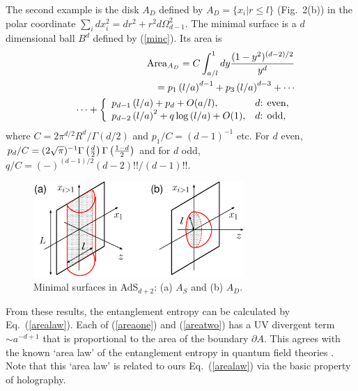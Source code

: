 \documentclass[twocolumn,amsmath,amssymb,nofootinbib,eqsecnum,tighten,prd]{revtex4}
\def\frac#1#2{{#1\over #2}}
\def\s{\sqrt}
\def\de{\partial}
\def\f {\frac}
\def\frac#1#2{{#1\over #2}}
\def\s{\sqrt}
\begin{document}
The second example
is the disk $A_{D}$ defined by $A_{D}=\{x_i|r\leq l\}$ (Fig.\ 2(b))
in the polar coordinate $\sum_{i}dx_i^2=dr^2+r^2d\Omega_{d-1}^2$.
The minimal surface is a $d$ dimensional ball $B^d$ defined by
(\ref{minc}). Its area is
\begin{eqnarray}
&&{\rm Area}_{A_{D}}
=
C
\int^1_{a/l}dy \f{(1-y^2)^{(d-2)/2}}{y^d}  \nonumber \\
&&=
  p_1  \left(l/a\right)^{d-1}
+ p_3 \left(l/a \right)^{d-3}
+\cdots  \label{areatwo}  \\
&&
\cdots
+\left\{
\begin{array}{ll}
\displaystyle
p_{d-1}\left(l/a\right)
+
p_d
+
O(a/l), &
 \mbox{$d$: even},   \\
\displaystyle
p_{d-2} \left(l/a\right)^{2}
+ q \log \left(l/a\right)+ O(1),
&  \mbox{$d$: odd,}   \\
\end{array}
\right.
 \nonumber
\end{eqnarray}
where $C=2\pi^{d/2}R^d/ \Gamma(d/2)$ and
$p_1/C = (d-1)^{-1}$ etc.
For $d$ even,
$p_d/C = (2\s{\pi})^{-1}\Gamma\left(\f{d}{2}\right)
\Gamma\left(\f{1-d}{2}\right)$
and for $d$ odd,
$q/C = (-)^{(d-1)/2}(d-2)!!/(d-1)!!$.


\begin{figure}
\begin{center}
\includegraphics[width=8cm,clip]{min_surfs.eps}
\end{center}
\caption{
\label{fig: min_surf}
Minimal surfaces in
AdS$_{d+2}$: (a) $A_S$
and (b) $A_D$.
}
\end{figure}


{}From these results, the entanglement entropy can be calculated by
Eq.\ (\ref{arealaw}). Each of (\ref{areaone}) and (\ref{areatwo})
has a UV divergent term $\sim a^{-d+1}$ that is proportional to the
area of the boundary $\de A$. This agrees with the known `area law'
of the entanglement entropy in quantum field theories
\cite{Bombelli,Srednicki}. Note that this `area law' is related to
ours Eq.\ (\ref{arealaw})  via the basic property of holography.
\end{document}
